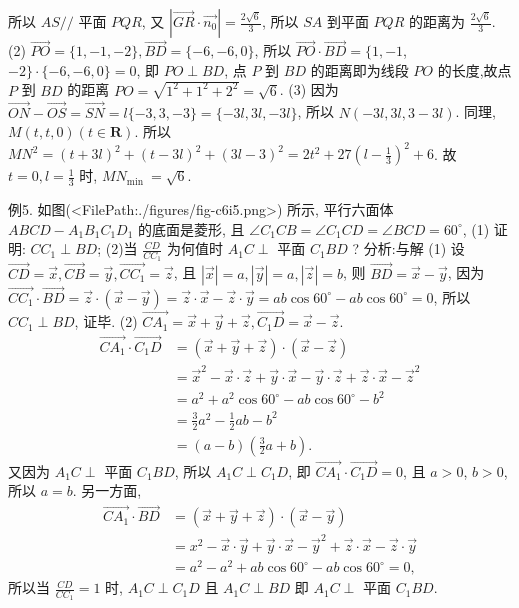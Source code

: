 所以 $A S / /$ 平面 $P Q R$, 又 $\left|\overrightarrow{G R} \cdot \overrightarrow{n_0}\right|=\frac{2 \sqrt{6}}{3}$, 所以 $S A$ 到平面 $P Q R$ 的距离为 $\frac{2 \sqrt{6}}{3}$.
(2) $\overrightarrow{P O}=\{1,-1,-2\}, \overrightarrow{B D}=\{-6,-6,0\}$, 所以 $\overrightarrow{P O} \cdot \overrightarrow{B D}=\{1,-1$, $-2\} \cdot\{-6,-6,0\}=0$, 即 $P O \perp B D$, 点 $P$ 到 $B D$ 的距离即为线段 $P O$ 的长度,故点 $P$ 到 $B D$ 的距离 $P O=\sqrt{1^2+1^2+2^2}=\sqrt{6}$.
(3) 因为 $\overrightarrow{O N}-\overrightarrow{O S}=\overrightarrow{S N}=l\{-3,3,-3\}=\{-3 l, 3 l,-3 l\}$, 所以 $N(-3 l, 3 l, 3-3 l)$.
同理, $M(t, t, 0)(t \in \mathbf{R})$.
所以 $M N^2=(t+3 l)^2+(t-3 l)^2+(3 l-3)^2=2 t^2+27\left(l-\frac{1}{3}\right)^2+6$.
故 $t=0, l=\frac{1}{3}$ 时, $M N_{\text {min }}=\sqrt{6}$.



例5. 如图(<FilePath:./figures/fig-c6i5.png>) 所示, 平行六面体 $A B C D- A_1 B_1 C_1 D_1$ 的底面是菱形, 且 $\angle C_1 C B=\angle C_1 C D= \angle B C D=60^{\circ}$,
(1) 证明: $C C_1 \perp B D$;
(2)当 $\frac{C D}{C C_1}$ 为何值时 $A_1 C \perp$ 平面 $C_1 B D$ ?
分析:与解 (1) 设 $\overrightarrow{C D}=\vec{x}, \overrightarrow{C B}=\vec{y}, \overrightarrow{C C_1}= \vec{z}$, 且 $|\vec{x}|=a,|\vec{y}|=a,|\vec{z}|=b$, 则 $\overrightarrow{B D}=\vec{x}-\vec{y}$,
因为 $\overrightarrow{C C_1} \cdot \overrightarrow{B D}=\vec{z} \cdot(\vec{x}-\vec{y})=\vec{z} \cdot \vec{x}-\vec{z} \cdot \vec{y}=a b \cos 60^{\circ}-a b \cos 60^{\circ}=0$,
所以 $C C_1 \perp B D$, 证毕.
(2) $\overrightarrow{C A_1}=\vec{x}+\vec{y}+\vec{z}, \overrightarrow{C_1 D}=\vec{x}-\vec{z}$.
$$
\begin{aligned}
\overrightarrow{C A_1} \cdot \overrightarrow{C_1 D} & =(\vec{x}+\vec{y}+\vec{z}) \cdot(\vec{x}-\vec{z}) \\
& =\vec{x}^2-\vec{x} \cdot \vec{z}+\vec{y} \cdot \vec{x}-\vec{y} \cdot \vec{z}+\vec{z} \cdot \vec{x}-\vec{z}^2 \\
& =a^2+a^2 \cos 60^{\circ}-a b \cos 60^{\circ}-b^2 \\
& =\frac{3}{2} a^2-\frac{1}{2} a b-b^2 \\
& =(a-b)\left(\frac{3}{2} a+b\right) .
\end{aligned}
$$
又因为 $A_1 C \perp$ 平面 $C_1 B D$, 所以 $A_1 C \perp C_1 D$, 即 $\overrightarrow{C A_1} \cdot \overrightarrow{C_1 D}=0$, 且 $a>0$, $b>0$, 所以 $a=b$.
另一方面,
$$
\begin{aligned}
\overrightarrow{C A_1} \cdot \overrightarrow{B D} & =(\vec{x}+\vec{y}+\vec{z}) \cdot(\vec{x}-\vec{y}) \\
& =x^2-\vec{x} \cdot \vec{y}+\vec{y} \cdot \vec{x}-\vec{y}^2+\vec{z} \cdot \vec{x}-\vec{z} \cdot \vec{y} \\
& =a^2-a^2+a b \cos 60^{\circ}-a b \cos 60^{\circ}=0,
\end{aligned}
$$
所以当 $\frac{C D}{C C_1}=1$ 时, $A_1 C \perp C_1 D$ 且 $A_1 C \perp B D$ 即 $A_1 C \perp$ 平面 $C_1 B D$.



